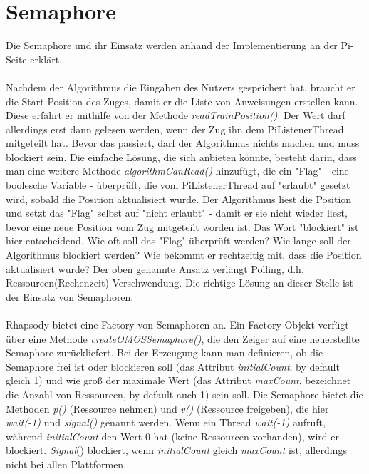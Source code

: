 \chapter{Semaphore}
Die Semaphore und ihr Einsatz werden anhand der Implementierung an der Pi-Seite erklärt.\\
\\
Nachdem der Algorithmus die Eingaben des Nutzers gespeichert hat, braucht er die Start-Position des Zuges, damit er die Liste von Anweisungen erstellen kann. Diese erfährt er mithilfe von der Methode \textit{readTrainPosition()}. Der Wert darf allerdings erst dann gelesen werden, wenn der Zug ihn dem PiListenerThread mitgeteilt hat. Bevor das passiert, darf der Algorithmus nichts machen und muss blockiert sein. Die einfache Lösung, die sich anbieten könnte, besteht darin, dass man eine weitere Methode \textit{algorithmCanRead()} hinzufügt, die ein "Flag" - eine boolesche Variable - überprüft, die vom PiListenerThread auf "erlaubt" gesetzt wird, sobald die Position aktualisiert wurde. Der Algorithmus liest die Position und setzt das "Flag" selbst auf "nicht erlaubt" - damit er sie nicht wieder liest, bevor eine neue Position vom Zug mitgeteilt worden ist. Das Wort "blockiert" ist hier entscheidend. Wie oft soll das "Flag" überprüft werden? Wie lange soll der Algorithmus blockiert werden? Wie bekommt er rechtzeitig mit, dass die Position aktualisiert wurde? Der oben genannte Ansatz verlängt Polling, d.h. Ressourcen(Rechenzeit)-Verschwendung. Die richtige Lösung an dieser Stelle ist der Einsatz von Semaphoren.\\
\\
Rhapsody bietet eine Factory von Semaphoren an. Ein Factory-Objekt verfügt über eine Methode \textit{createOMOSSemaphore()}, die den Zeiger auf eine neuerstellte Semaphore zurückliefert. Bei der Erzeugung kann man definieren, ob die Semaphore frei ist oder blockieren soll (das Attribut \textit{initialCount}, by default gleich 1) und wie groß der maximale Wert (das Attribut \textit{maxCount}, bezeichnet die Anzahl von Ressourcen, by default auch 1) sein soll. Die Semaphore bietet die Methoden \textit{p()} (Ressource nehmen) und \textit{v()} (Ressource freigeben), die hier \textit{wait(-1)} und \textit{signal()} genannt werden. Wenn ein Thread \textit{wait(-1)} aufruft, während \textit{initialCount} den Wert 0 hat (keine Ressourcen vorhanden), wird er blockiert. \textit{Signal}() blockiert, wenn \textit{initialCount} gleich \textit{maxCount} ist, allerdings nicht bei allen Plattformen.\\
